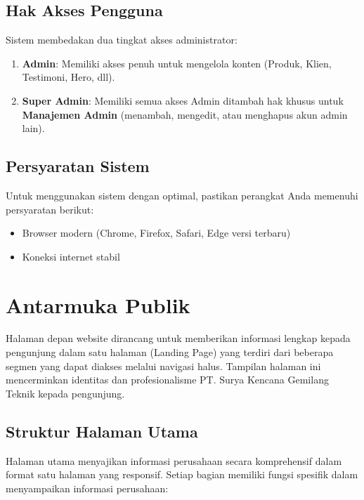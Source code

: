 \documentclass[12pt,a4paper]{report}
\begin{document}
\section{Hak Akses Pengguna}
Sistem membedakan dua tingkat akses administrator:
\begin{enumerate}
    \item \textbf{Admin}: Memiliki akses penuh untuk mengelola konten (Produk, Klien, Testimoni, Hero, dll).
    \item \textbf{Super Admin}: Memiliki semua akses Admin ditambah hak khusus untuk \textbf{Manajemen Admin} (menambah, mengedit, atau menghapus akun admin lain).
\end{enumerate}

\section{Persyaratan Sistem}
Untuk menggunakan sistem dengan optimal, pastikan perangkat Anda memenuhi persyaratan berikut:
\begin{itemize}
    \item Browser modern (Chrome, Firefox, Safari, Edge versi terbaru)
    \item Koneksi internet stabil
\end{itemize}

\chapter{Antarmuka Publik}

Halaman depan website dirancang untuk memberikan informasi lengkap kepada pengunjung dalam satu halaman (Landing Page) yang terdiri dari beberapa segmen yang dapat diakses melalui navigasi halus. Tampilan halaman ini mencerminkan identitas dan profesionalisme PT. Surya Kencana Gemilang Teknik kepada pengunjung.

\section{Struktur Halaman Utama}
Halaman utama menyajikan informasi perusahaan secara komprehensif dalam format satu halaman yang responsif. Setiap bagian memiliki fungsi spesifik dalam menyampaikan informasi perusahaan:
\end{document}

